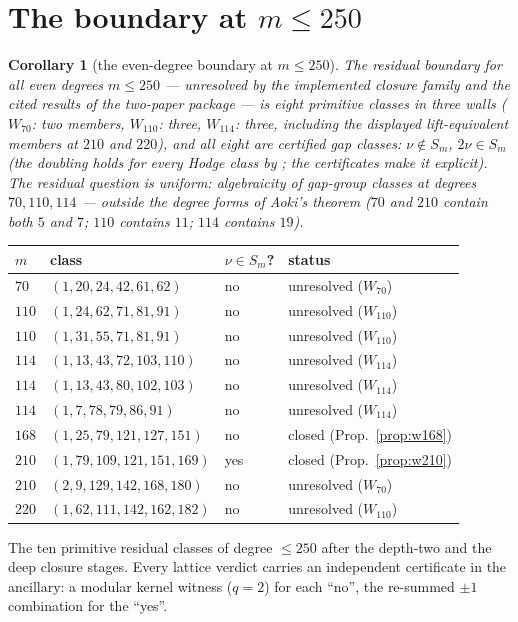 \documentclass[11pt]{amsart}
\newtheorem{corollary}[theorem]{Corollary}
\theoremstyle{remark}
\begin{document}
\section{\texorpdfstring{The boundary at $m\le250$}{The boundary at m <= 250}}\label{sec:boundary}

\begin{corollary}[the even-degree boundary at $m\le250$]\label{cor:evenbdry}
The residual boundary for all \emph{even} degrees $m\le250$ --- unresolved by the implemented
closure family and the cited results of the two-paper package --- is eight primitive classes in three
walls ($W_{70}$: two members, $W_{110}$: three, $W_{114}$: three, including the displayed
lift-equivalent members at $210$ and $220$), and
all eight are certified gap classes: $\nu\notin S_m$, $2\nu\in S_m$ (the doubling holds for
\emph{every} Hodge class by \cite[Thm.~2.1]{Aoki00}; the certificates make it explicit). The
residual question is uniform: algebraicity of gap-group
classes at degrees $70, 110, 114$ --- outside the degree forms of Aoki's theorem ($70$ and $210$
contain both $5$ and $7$; $110$ contains $11$; $114$ contains $19$).
\end{corollary}

\medskip
\begin{center}\small
\begin{tabular}{llll}
\toprule
$m$ & class & $\nu\in S_m$? & status\\
\midrule
$70$  & $(1,20,24,42,61,62)$      & no  & unresolved ($W_{70}$)\\
$110$ & $(1,24,62,71,81,91)$      & no  & unresolved ($W_{110}$)\\
$110$ & $(1,31,55,71,81,91)$      & no  & unresolved ($W_{110}$)\\
$114$ & $(1,13,43,72,103,110)$    & no  & unresolved ($W_{114}$)\\
$114$ & $(1,13,43,80,102,103)$    & no  & unresolved ($W_{114}$)\\
$114$ & $(1,7,78,79,86,91)$       & no  & unresolved ($W_{114}$)\\
$168$ & $(1,25,79,121,127,151)$   & no  & closed (Prop.~\ref{prop:w168})\\
$210$ & $(1,79,109,121,151,169)$  & yes & closed (Prop.~\ref{prop:w210})\\
$210$ & $(2,9,129,142,168,180)$   & no  & unresolved ($W_{70}$)\\
$220$ & $(1,62,111,142,162,182)$  & no  & unresolved ($W_{110}$)\\
\bottomrule
\end{tabular}

\smallskip
\parbox{0.92\linewidth}{\footnotesize The ten primitive residual classes of degree $\le250$ after the
depth-two and the deep closure stages. Every lattice verdict carries an independent certificate in the ancillary: a
modular kernel witness ($q=2$) for each ``no'', the re-summed $\pm1$ combination for the ``yes''.}
\end{center}
\end{document}
